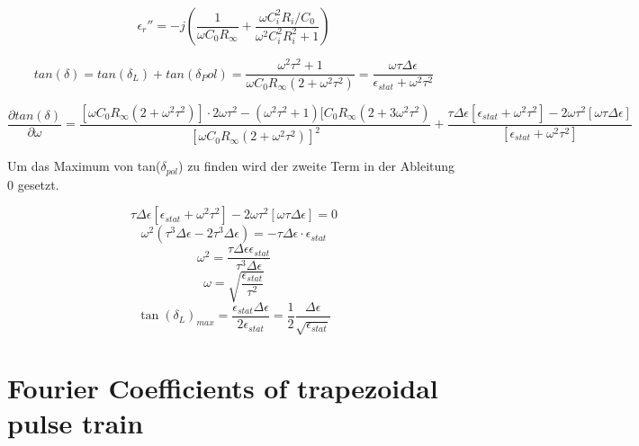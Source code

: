 \begin{equation}
\epsilon_r'' = -j \left(\frac{1}{\omega C_0 R_\infty}+\frac{\omega C_i^2 R_i / C_0}{\omega^2 C_i^2 R_i^2 +1} \right)
\end{equation}

\begin{equation}
tan(\delta) = tan(\delta_L) + tan( \delta_Pol) = \frac{\omega^2 \tau^2+1}{\omega C_0 R_\infty (2+ \omega^2 \tau^2)}=\frac{\omega \tau \Delta \epsilon}{\epsilon_{stat} + \omega^2 \tau^2}
\end{equation}

\begin{equation}
\frac{\partial tan(\delta)}{ \partial \omega} = \frac{[\omega C_0 R_\infty (2+\omega^2 \tau^2)]\cdot 2 \omega \tau^2 - (\omega^2 \tau^2 +1) [C_0 R_\infty (2+3 \omega^2 \tau^2)  }{[\omega C_0 R_\infty (2+\omega^2 \tau^2)]^2}+ \frac{\tau \Delta \epsilon [\epsilon_{stat} + \omega^2 \tau^2] - 2 \omega \tau^2 [\omega \tau \Delta \epsilon]}{[\epsilon_{stat} +\omega^2 \tau^2]}
\end{equation}

Um das Maximum von tan($\delta_{pol}$) zu finden wird der zweite Term in der Ableitung 0 gesetzt.

\begin{equation}
\tau \Delta \epsilon [\epsilon_{stat} + \omega^2 \tau^2] -2\omega \tau^2 [\omega \tau \Delta \epsilon] = 0
\end{equation}
\begin{equation}
\omega^2 (\tau^3 \Delta \epsilon -2 \tau^3 \Delta \epsilon) = - \tau \Delta \epsilon \cdot \epsilon_{stat}
\end{equation}
\begin{equation}
\omega^2 = \frac{\tau \Delta \epsilon \epsilon_{stat}}{\tau^3 \Delta \epsilon}
\end{equation}
\begin{equation}
\omega = \sqrt{\frac{\epsilon_{stat}}{\tau^2}}
\end{equation}
\begin{equation}
\tan(\delta_L)_{max} = \frac{\epsilon_{stat} \Delta\epsilon}{2\epsilon_{stat}} = \frac{1}{2} \frac{\Delta \epsilon}{\sqrt{\epsilon_{stat}}}
\end{equation}


\section{Fourier Coefficients of trapezoidal pulse  train }


